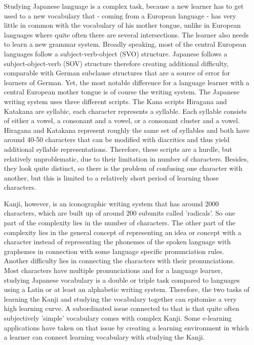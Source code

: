 Studying Japanese language is a complex task, because a new learner has to get used to a new vocabulary that - coming from a European language - has very little in common with the vocabulary of his mother tongue, unlike in European languages where quite often there are several intersections. The learner also needs to learn a new grammar system. Broadly speaking, most of the central European languages follow a subject-verb-object (SVO) structure. Japanese follows a subject-object-verb (SOV) structure therefore creating additional difficulty, comparable with German subclause structures that are a source of error for learners of German. 
Yet, the most notable difference for a language learner with a central European mother tongue is of course the writing system. The Japanese writing system uses three different scripts. The Kana scripts Hiragana and Katakana are syllabic, each character represents a syllable. Each syllable consists of either a vowel, a consonant and a vowel, or a consonant cluster and a vowel. Hiragana and Katakana represent roughly the same set of syllables and both have around 40-50 characters that can be modified with diacritics and thus yield additional syllable representations. Therefore, these scripts are a hurdle, but relatively unproblematic, due to their limitation in number of characters. Besides, they look quite distinct, so there is the problem of confusing one character with another, but this is limited to a relatively short period of learning those characters.

Kanji, however, is an iconographic writing system that has around 2000 characters, which are built up of around 200 subunits called 'radicals'. So one part of the complexity lies in the number of characters. The other part of the complexity lies in the general concept of representing an idea or concept with a character instead of representing the phonemes of the spoken language with graphemes in connection with some language specific pronunciation rules. Another difficulty lies in connecting the characters with their pronunciations. Most characters have multiple pronunciations and for a language learner, studying Japanese vocabulary is a double or triple task compared to languages using a Latin or at least an alphabetic writing system. Therefore, the two tasks of learning the Kanji and studying the vocabulary together can epitomise a very high learning curve. A subordinated issue connected to that is that quite often subjectively 'simple' vocabulary comes with complex Kanji.
Some e-learning applications have taken on that issue by creating a learning environment in which a learner can connect learning vocabulary with studying the Kanji.

